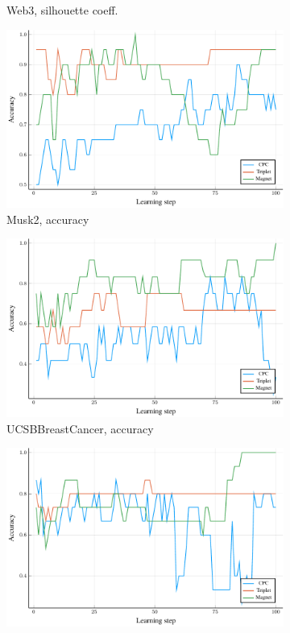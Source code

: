 \begin{figure}
\begin{subfigure}[t]{0.32\textwidth}
    \caption{Web3, silhouette coeff.}
  \end{subfigure}
  \begin{subfigure}[t]{0.32\textwidth}
    \centering
    \includegraphics[width=\textwidth]{images/Musk2_accuracy/Musk2_accuracy.pdf}
    \caption{Musk2, accuracy}
  \end{subfigure}
  \begin{subfigure}[t]{0.32\textwidth}
    \centering
    \includegraphics[width=\textwidth]{images/UCSBBreastCancer_accuracy/UCSBBreastCancer_accuracy.pdf}
    \caption{UCSBBreastCancer, accuracy}
  \end{subfigure}
  \begin{subfigure}[t]{0.32\textwidth}
    \centering
    \includegraphics[width=\textwidth]{images/Web3_accuracy/Web3_accuracy.pdf}

\end{subfigure}
\end{figure}
